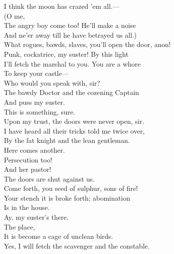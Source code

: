\documentclass[a4paper,oneside,12pt]{memoir}
\begin{document}
\begin{drama*}
\facespeaks I think the moon has crazed 'em all.---\\
 (O me,\\
The angry boy come too! He'll make a noise\\
And ne'er away till he have betrayed us all.)\\
\kastrilspeaks What rogues, bawds, slaves, you'll open the door, anon!\\
Punk, cockatrice, my suster! By this light\\
I'll fetch the marshal to you. You are a whore\\
To keep your castle---\\
\facespeaks {} Who would you speak with, sir?\\
\kastrilspeaks The bawdy Doctor and the cozening Captain\\
And puss my suster.\\
\lovewitspeaks {} This is something, sure.\\
\facespeaks Upon my trust, the doors were never open, sir.\\
\kastrilspeaks I have heard all their tricks told me twice over,\\
By the fat knight and the lean gentleman.\\
\lovewitspeaks Here comes another.\\
\facespeaks {} Persecution too!\\
And her pastor!\\
\tribulationspeaks {} The doors are shut against us.\\
\persecutionspeaks Come forth, you seed of sulphur, sons of fire!\\
Your stench it is broke forth; abomination\\
Is in the house.\\
\kastrilspeaks {} Ay, my suster's there.\\
\persecutionspeaks {} The place,\\
It is become a cage of unclean birds.\\
\kastrilspeaks Yes, I will fetch the scavenger and the constable.\\

\end{drama*}
\end{document}
